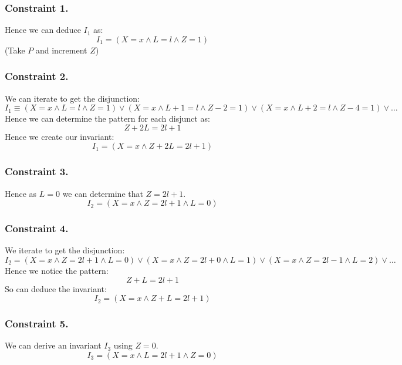 \documentclass{report}
\begin{document}
\begin{itemize}
{                \subsubsection*{Constraint 1.}
                    Hence we can deduce $I_1$ as:
                    \[I_1 = (X = x \land L = l \land Z = 1)\]
                    (Take $P$ and increment $Z$)
                \subsubsection*{Constraint 2.}
                    We can iterate to get the disjunction:
                    \[I_1 \equiv (X=x \land L=l \land Z = 1) \lor (X=x \land L+1 = l \land Z-2 = 1) \lor (X=x \land L+2 = l \land Z - 4 = 1) \lor \dots\]
                    Hence we can determine the pattern for each disjunct as:
                    \[Z + 2L = 2l + 1\]
                    Hence we create our invariant:
                    \[I_1 = (X = x \land Z + 2L = 2l + 1)\]
                \subsubsection*{Constraint 3.}
                    Hence as $L=0$ we can determine that $Z = 2l + 1$.
                    \[I_2 = (X=x \land Z = 2l + 1 \land L = 0)\]
                \subsubsection*{Constraint 4.}
                    We iterate to get the disjunction:
                    \[I_2 = (X = x  \land Z = 2l + 1 \land L = 0) \lor (X = x  \land Z = 2l + 0 \land L = 1) \lor (X = x  \land Z = 2l - 1 \land L = 2) \lor \dots\]
                    Hence we notice the pattern:
                    \[Z + L = 2l + 1\]
                    So can deduce the invariant:
                    \[I_2 = (X = x \land Z + L = 2l + 1)\]
                \subsubsection*{Constraint 5.}
                    We can derive an invariant $I_3$ using $Z = 0$.
                    \[I_3 = (X=x \land L = 2l + 1 \land Z = 0)\]
}
\end{itemize}
\end{document}
